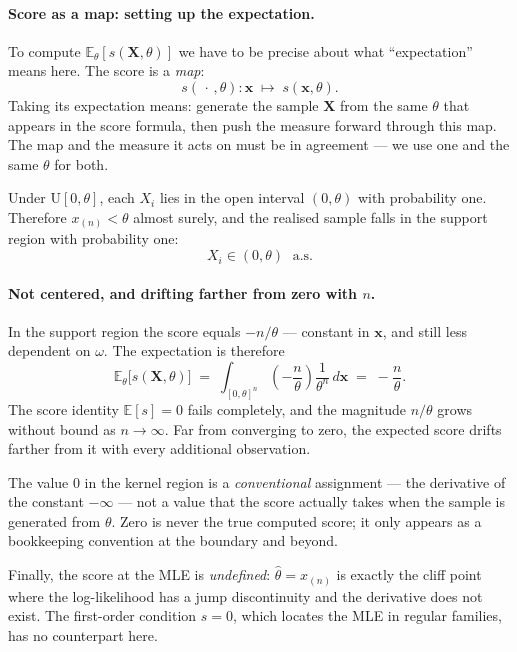 \documentclass[a4paper,oneside,12pt]{extarticle}
\theoremstyle{plain}
\theoremstyle{definition}
\theoremstyle{remark}
\newcommand*{\E}{\mathbb{E}}
\begin{document}
\paragraph{Score as a map: setting up the expectation.}

To compute $\E_\theta[s(\mathbf{X},\theta)]$ we have to be precise
about what ``expectation'' means here.  The score is a \emph{map}:
\[
  s(\,\cdot\,,\theta)\colon \mathbf{x} \;\longmapsto\; s(\mathbf{x},\theta).
\]
Taking its expectation means: generate the sample $\mathbf{X}$ from
the same $\theta$ that appears in the score formula, then push the
measure forward through this map.  The map and the measure it acts on
must be in agreement --- we use one and the same $\theta$ for both.

Under $\mathrm{U}[0,\theta]$, each $X_i$ lies in the open interval
$(0,\theta)$ with probability one.  Therefore $x_{(n)} < \theta$
almost surely, and the realised sample falls in the support region
with probability one:
\[
  X_i \in (0,\theta) \;\text{ a.s.}
\]

\paragraph{Not centered, and drifting farther from zero with $n$.}

In the support region the score equals $-n/\theta$ --- constant in
$\mathbf{x}$, and still less dependent on $\omega$.  The expectation
is therefore
\[
  \E_\theta\bigl[s(\mathbf{X},\theta)\bigr]
  \;=\; \int_{[0,\theta]^n}
        \!\!\left(-\frac{n}{\theta}\right) \frac{1}{\theta^n}\,d\mathbf{x}
  \;=\; -\frac{n}{\theta}.
\]
The score identity $\E[s]=0$ fails completely, and the magnitude
$n/\theta$ grows without bound as $n\to\infty$.  Far from converging
to zero, the expected score drifts farther from it with every
additional observation.

The value $0$ in the kernel region is a \emph{conventional}
assignment --- the derivative of the constant $-\infty$ --- not a
value that the score actually takes when the sample is generated from
$\theta$.  Zero is never the true computed score; it only
appears as a bookkeeping convention at the boundary and beyond.

Finally, the score at the MLE is \emph{undefined}: $\hat\theta =
x_{(n)}$ is exactly the cliff point where the log-likelihood has a
jump discontinuity and the derivative does not exist.  The first-order
condition $s = 0$, which locates the MLE in regular families, has no
counterpart here.
\end{document}
